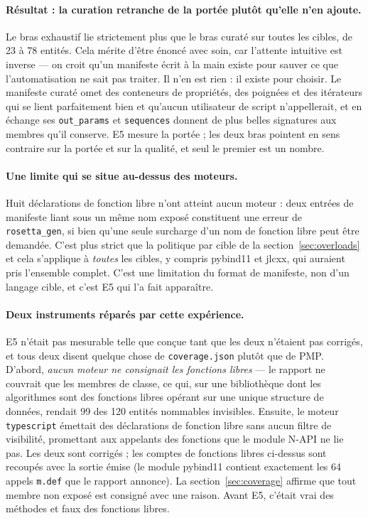 \documentclass[11pt,a4paper]{article}
\newcommand{\code}[1]{\texttt{\small #1}}
\begin{document}
\paragraph{Résultat : la curation retranche de la portée plutôt qu'elle n'en
ajoute.} Le bras exhaustif lie strictement plus que le bras curaté sur toutes les
cibles, de 23 à 78 entités. Cela mérite d'être énoncé avec soin, car l'attente
intuitive est inverse --- on croit qu'un manifeste écrit à la main existe pour
sauver ce que l'automatisation ne sait pas traiter. Il n'en est rien : il existe
pour choisir. Le manifeste curaté omet des conteneurs de propriétés, des poignées
et des itérateurs qui se lient parfaitement bien et qu'aucun utilisateur de
script n'appellerait, et en échange ses \code{out\_params} et \code{sequences}
donnent de plus belles signatures aux membres qu'il conserve. E5 mesure la
portée ; les deux bras pointent en sens contraire sur la portée et sur la
qualité, et seul le premier est un nombre.

\paragraph{Une limite qui se situe au-dessus des moteurs.} Huit déclarations de
fonction libre n'ont atteint aucun moteur : deux entrées de manifeste liant sous
un même nom exposé constituent une erreur de \code{rosetta\_gen}, si bien qu'une
seule surcharge d'un nom de fonction libre peut être demandée. C'est plus strict
que la politique par cible de la section~\ref{sec:overloads} et cela s'applique à
\emph{toutes} les cibles, y compris pybind11 et jlcxx, qui auraient pris
l'ensemble complet. C'est une limitation du format de manifeste, non d'un langage
cible, et c'est E5 qui l'a fait apparaître.

\paragraph{Deux instruments réparés par cette expérience.} E5 n'était pas
mesurable telle que conçue tant que les deux n'étaient pas corrigés, et tous deux
disent quelque chose de \code{coverage.json} plutôt que de PMP. D'abord,
\emph{aucun moteur ne consignait les fonctions libres} --- le rapport ne couvrait
que les membres de classe, ce qui, sur une bibliothèque dont les algorithmes sont
des fonctions libres opérant sur une unique structure de données, rendait 99 des
120 entités nommables invisibles. Ensuite, le moteur \code{typescript} émettait
des déclarations de fonction libre sans aucun filtre de visibilité, promettant
aux appelants des fonctions que le module N-API ne lie pas. Les deux sont
corrigés ; les comptes de fonctions libres ci-dessus sont recoupés avec la sortie
émise (le module pybind11 contient exactement les 64 appels \code{m.def} que le
rapport annonce). La section~\ref{sec:coverage} affirme que tout membre non
exposé est consigné avec une raison. Avant E5, c'était vrai des méthodes et faux
des fonctions libres.
\end{document}
